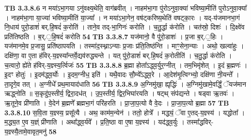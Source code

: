 \documentclass[17pt]{extarticle}
\begin{document}
{{{{{{{{{{{{{{{{{{{                                \textbf{ TB 3.3.8.6} \newline
                  न मया॑ऽभा॒गया ऽनु॑वक्ष्य॒थेति॒ वाग॑ब्रवीत् । नाहम॑भा॒गा पु॑रोऽनुवा॒क्या॑ भविष्या॒मीति॑ पुरोऽनुवा॒क्या᳚ । नाहम॑भा॒गा या॒ज्या॑ भविष्या॒मीति॑ या॒ज्या᳚ । न मया॑ऽभा॒गेन॒ वष॑ट्करिष्य॒थेति॑ वषट्का॒रः । यद्-य॑जमानभा॒गं नि॒धाय॑ पुरो॒डाशं॑ बर्.हि॒षदं॑ क॒रोति॑ । ताने॒व तद्-भा॒गिनः॑ करोति । च॒तु॒र्द्धा क॑रोति । चत॑स्रो॒ दिशः॑ । दि॒क्ष्वे॑व प्रति॑तिष्ठति । ब॒र्.॒हि॒षदं॑ करोति \textbf{ 54} \newline
                  \newline
                                \textbf{ TB 3.3.8.7} \newline
                  यज॑मानो॒ वै पु॑रो॒डाशः॑ । प्र॒जा ब॒र्.॒हिः । यज॑मानमे॒व प्र॒जासु॒ प्रति॑ष्ठापयति । तस्मा॑द॒स्थ्नाऽन्याः प्र॒जाः प्र॑ति॒तिष्ठ॑न्ति । माꣳ॒॒सेना॒न्याः । अथो॒ खल्वा॑हुः । दक्षि॑णा॒ वा ए॒ता ह॑विर्-य॒ज्ञ्स्या᳚न्तर्वे॒द्यव॑रुद्ध्यन्ते । यत् पु॑रो॒डाशं॑ बर्.हि॒षदं॑ क॒रोतीति॑ । च॒तु॒र्द्धा क॑रोति । च॒त्वारो॒ ह्ये॑ते ह॑विर्-य॒ज्ञ्स्य॒र्त्विजः॑ \textbf{ 55} \newline
                  \newline
                                \textbf{ TB 3.3.8.8} \newline
                  ब्र॒ह्मा होता᳚ऽद्ध्व॒र्युर॒ग्नीत् । तम॒भिमृ॑शेत् । इ॒दं ब्र॒ह्मणः॑ । इ॒दꣳ होतुः॑ । इ॒दम॑द्ध्व॒र्योः । इ॒दम॒ग्नीध॒ इति॑ । यथै॒वादः सौ॒म्ये᳚ऽद्ध्व॒रे । आ॒देश॑मृ॒त्विग्भ्यो॒ दक्षि॑णा नी॒यन्ते᳚ । ता॒दृगे॒व तत् । अ॒ग्नीधे᳚ प्रथ॒मायाद॑धाति \textbf{ 56} \newline
                  \newline
                                \textbf{ TB 3.3.8.9} \newline
                  अ॒ग्निमु॑खा॒ ह्यृद्धिः॑ । अ॒ग्निमु॑खामे॒वर्द्धिं॒ ॅयज॑मान ऋद्ध्नोति ॥ स॒कृदु॑प॒स्तीर्य॒ द्विरा॒दध॑त् । उ॒प॒स्तीर्य॒ द्विर॒भिघा॑रयति । षट्थ् संप॑द्यन्ते । षड्वा ऋ॒तवः॑ । ऋ॒तूने॒व प्री॑णाति । वे॒देन॑ ब्र॒ह्मणे᳚ ब्रह्मभा॒गं परि॑हरति । प्रा॒जा॒प॒त्यो वै वे॒दः । प्रा॒जा॒प॒त्यो ब्र॒ह्मा \textbf{ 57} \newline
                  \newline
                                \textbf{ TB 3.3.8.10} \newline
                  स॒वि॒ता य॒ज्ञ्स्य॒ प्रसू᳚त्यै । अथ॒ काम॑म॒न्येन॑ । ततो॒ होत्रे᳚ । मद्ध्यं॒ ॅवा ए॒तद्-य॒ज्ञ्स्य॑ । यद्धोता᳚ । म॒द्ध्य॒त ए॒व य॒ज्ञ्ं प्री॑णाति । अथा᳚द्ध्व॒र्यवे᳚ । प्र॒ति॒ष्ठा वा ए॒षा य॒ज्ञ्स्य॑ । यद॑द्ध्व॒र्युः । तस्मा᳚द्धविर्-य॒ज्ञ्स्यै॒तामे॒वावृत॒मनु॑ \textbf{ 58} \newline
}}}}}}}}}}}}}}}}}}}
\end{document}
